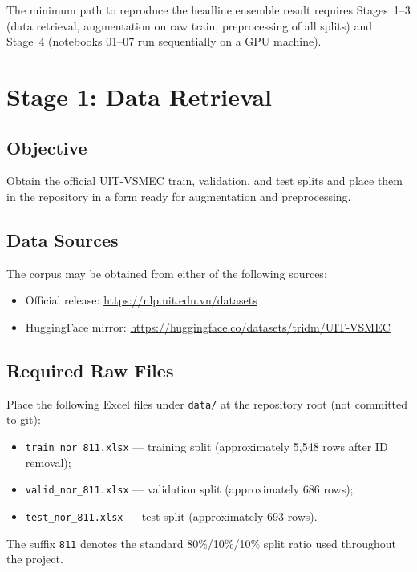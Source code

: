 \documentclass[11pt,a4paper]{article}
\newcommand{\repo}[1]{\texttt{#1}}
\begin{document}
The minimum path to reproduce the headline ensemble result requires Stages~1--3 (data retrieval, augmentation on raw train, preprocessing of all splits) and Stage~4 (notebooks 01--07 run sequentially on a GPU machine).

\section{Stage 1: Data Retrieval}
\label{sec:retrieval}

\subsection{Objective}
Obtain the official UIT-VSMEC train, validation, and test splits and place them in the repository in a form ready for augmentation and preprocessing.

\subsection{Data Sources}
The corpus may be obtained from either of the following sources:
\begin{itemize}[nosep]
  \item Official release: \url{https://nlp.uit.edu.vn/datasets}
  \item HuggingFace mirror: \url{https://huggingface.co/datasets/tridm/UIT-VSMEC}
\end{itemize}

\subsection{Required Raw Files}
Place the following Excel files under \repo{data/} at the repository root (not committed to git):
\begin{itemize}[nosep]
  \item \repo{train\_nor\_811.xlsx} --- training split (approximately 5{,}548 rows after ID removal);
  \item \repo{valid\_nor\_811.xlsx} --- validation split (approximately 686 rows);
  \item \repo{test\_nor\_811.xlsx} --- test split (approximately 693 rows).
\end{itemize}
The suffix \texttt{811} denotes the standard 80\%/10\%/10\% split ratio used throughout the project.
\end{document}
